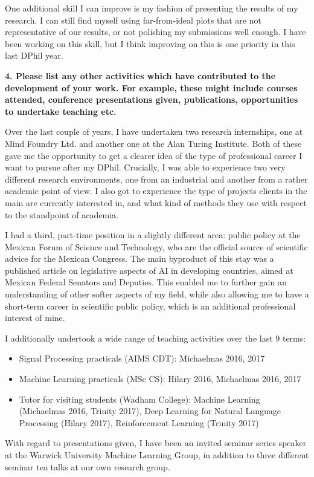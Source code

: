 \documentclass[pdftex,12pt,a4paper]{article}
\theoremstyle{definition}
\theoremstyle{remark}
\begin{document}
One additional skill I can improve is my fashion of presenting the results of my research. I can still find myself using far-from-ideal plots that are not representative of our results, or not polishing my submissions well enough. I have been working on this skill, but I think improving on this is one priority in this last DPhil year.


\textbf{4. Please list any other activities which have contributed to the development of your work. For example, these might include courses attended, conference presentations given, publications, opportunities to undertake teaching etc.}

Over the last couple of years, I have undertaken two research internships, one at Mind Foundry Ltd. and another one at the Alan Turing Institute. Both of these gave me the opportunity to get a clearer idea of the type of professional career I want to pursue after my DPhil. Crucially, I was able to experience two very different research environments, one from an industrial and another from a rather academic point of view. I also got to experience the type of projects clients in the main are currently interested in, and what kind of methods they use with respect to the standpoint of academia. 

I had a third, part-time position in a slightly different area: public policy at the Mexican Forum of Science and Technology, who are the official source of scientific advice for the Mexican Congress. The main byproduct of this stay was a published article on legislative aspects of AI in developing countries, aimed at Mexican Federal Senators and Deputies. This enabled me to further gain an understanding of other softer aspects of my field, while also allowing me to have a short-term career in scientific public policy, which is an additional professional interest of mine.

I additionally undertook a wide range of teaching activities over the last 9 terms: 
\begin{itemize}
    \item Signal Processing practicals (AIMS CDT): Michaelmas 2016, 2017
    \item Machine Learning practicals (MSc CS): Hilary 2016, Michaelmas 2016, 2017
    \item Tutor for visiting students (Wadham College): Machine Learning (Michaelmas 2016, Trinity 2017), Deep Learning for Natural Language Processing (Hilary 2017), Reinforcement Learning (Trinity 2017)
\end{itemize}

With regard to presentations given, I have been an invited seminar series speaker at the Warwick University Machine Learning Group, in addition to three different seminar tea talks at our own research group.




\end{document}
